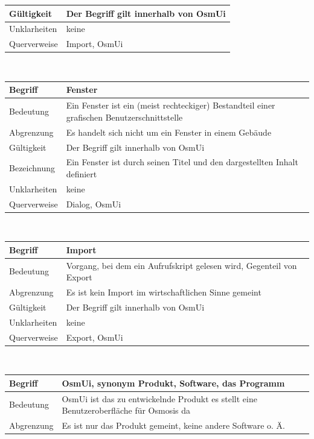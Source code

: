 \documentclass[a4paper,12pt]{scrartcl}
\begin{document}
\begin{center}
\begin{tabular}{|p{5cm}|p{10cm}|}
\hline Gültigkeit & Der Begriff gilt innerhalb von OsmUi \\ 
\hline Unklarheiten & keine \\ 
\hline Querverweise & Import, OsmUi \\ 
\hline
\end{tabular}
\vspace{0.7cm}
\\
\begin{tabular}{|p{5cm}|p{10cm}|}
\hline Begriff & \textbf{Fenster}\\ 
\hline Bedeutung & Ein Fenster ist ein (meist rechteckiger) Bestandteil einer grafischen Benutzerschnittstelle \\ 
\hline Abgrenzung & Es handelt sich nicht um ein Fenster in einem Gebäude\\ 
\hline Gültigkeit & Der Begriff gilt innerhalb von OsmUi\\ 
\hline Bezeichnung & Ein Fenster ist durch seinen Titel und den dargestellten Inhalt definiert \\ 
\hline Unklarheiten & keine \\ 
\hline Querverweise & Dialog, OsmUi \\ 
\hline
\end{tabular}
\vspace{0.7cm}
\\
\begin{tabular}{|p{5cm}|p{10cm}|}
\hline Begriff & \textbf{Import}\\
\hline Bedeutung & Vorgang, bei dem ein Aufrufskript gelesen wird, Gegenteil von Export \\ 
\hline Abgrenzung & Es ist kein Import im wirtschaftlichen Sinne gemeint\\ 
\hline Gültigkeit & Der Begriff gilt innerhalb von OsmUi \\ 
\hline Unklarheiten & keine \\ 
\hline Querverweise & Export, OsmUi \\ 
\hline
\end{tabular}
\vspace{0.7cm}
\\
\begin{tabular}{|p{5cm}|p{10cm}|}
\hline Begriff & \textbf{OsmUi}, synonym Produkt, Software, das Programm \\ 
\hline Bedeutung & OsmUi ist das zu entwickelnde Produkt es stellt eine Benutzeroberfläche für Osmosis da \\ 
\hline Abgrenzung & Es ist nur das Produkt gemeint, keine andere Software o. Ä. \\ 

\end{tabular}
\end{center}
\end{document}
